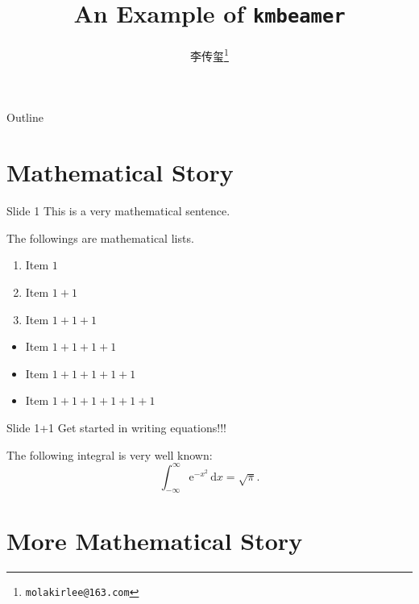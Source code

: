 \documentclass{beamer}
\title{An Example of \texttt{kmbeamer}}
\author{李传玺\footnote{\texttt{molakirlee@163.com}}}
\begin{document}
\begin{frame}
  \maketitle
\end{frame}

\begin{frame}{Outline}
  \tableofcontents
\end{frame}

\section{Mathematical Story}

\begin{frame}{Slide 1}
  This is a very mathematical sentence.

  \pause

  The followings are mathematical lists.

  \begin{enumerate}
  \item Item $1$\pause
  \item Item $1+1$\pause
  \item Item $1+1+1$
  \end{enumerate}

  \pause

  \begin{itemize}
  \item Item $1+1+1+1$\pause
  \item Item $1+1+1+1+1$\pause
  \item Item $1+1+1+1+1+1$
  \end{itemize}
\end{frame}


\begin{frame}{Slide 1+1}
  \alert{Get started in writing equations!!!}

  \begin{theorem}
    The following integral is very well known:
    \begin{equation}
      \int_{-\infty}^\infty \mathrm{e}^{-x^2}\,\mathrm{d}x=\sqrt{\pi}.
    \end{equation}

  \end{theorem}
\end{frame}


\section{More Mathematical Story}
\end{document}
